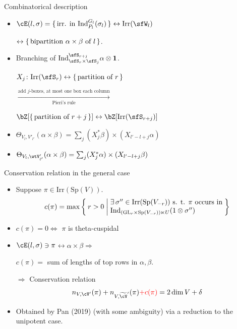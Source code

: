 \documentclass[t,mathserif,11pt,usenames,dvipsnames]{beamer}
\theoremstyle{plain}
\theoremstyle{definition}
\newcommand{\bfone}{\mathbf{1}}
\def\GL{\mathrm{GL}}
\def\Ind{{\rm Ind}}
\def\Sp{{\mathrm{Sp}}}
\def\Irr{{\mathrm{Irr}}}
\def\red{\color{red}}
\begin{document}
\begin{frame}{Combinatorical description}
  \begin{itemize}
    \item $\cE(l,\sigma)=\set{\text{irr. in } \Ind_{P_l}^{G_l}(\sigma_l)}\leftrightarrow \Irr(\sfW_l)$
    \item[] \hspace{12em} $\leftrightarrow
          \set{\text{bipartition $\alpha\times \beta$ of } l}$.
         \pause 
    \item Branching of $\Ind_{\sfS_r\times \sfS_j}^{\sfS_{r+j}} \alpha\otimes
          \bfone$.
    \item[] $X_j\colon \Irr(\sfS_r)\leftrightarrow \set{\text{partition of
          $r$}}$ 
    \item[] \hspace{5em}
          $ \xrightarrow[\text{Pieri's rule} ]{\text{add $j$-boxes, at most
          one box each column}}$
    \item[] \hspace{8em}  $\bZ[\set{\text{partition of $r+j$}}] \leftrightarrow \bZ[\Irr(\sfS_{r+j})] $
    \item[]
    \item $\Theta_{V_l,V'_{l'}}(\alpha\times \beta) = \sum_{j} (X^*_j
          \beta)\times (X_{l'-l+j}\alpha)$
    \item $\Theta_{V_l,\wtV'_{l'}}(\alpha\times \beta) = \sum_{j} (X^*_j
          \alpha)\times (X_{l'-l+j}\beta)$
  \end{itemize}
\end{frame}
  
\begin{frame}{Conservation relation in the general case}
  \begin{itemize}
    \item Suppose $\pi\in \Irr(\Sp(V))$.
          \[
          c(\pi) = \max\Set{r>0|\begin{minipage}{16em}
         $\exists \, \sigma''\in \Irr(\Sp(V_{-r}))$ s. t. $\pi$
          occurs in \\
          $\Ind_{(\GL_{r}\times \Sp(V_{-r}))\ltimes U}(1 \otimes \sigma'')$
          \end{minipage}
        }
      \]
    \item $c(\pi) = 0 \Leftrightarrow $ $\pi$ is theta-cuspidal
    \pause
    \item $\cE(l,\sigma)\ni \pi$$\leftrightarrow \alpha\times \beta\Rightarrow$
    \item[] \hspace{2em} 
          {\red $c(\pi) = $ sum of lengths of top rows in $\alpha,\beta$. }
    \pause
    \item[$\Rightarrow $] {\color{blue} Conservation relation }
          \[
          n_{V,\cV'}(\pi) + n_{V, \tcV'}(\pi) {\color{red}+ c(\pi)} = 2\dim V + \delta
          \]
    \item Obtained by Pan (2019) (with some ambiguity)  via a reduction to the unipotent case.
  \end{itemize}
\end{frame}
\end{document}
